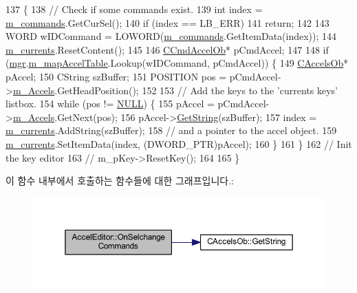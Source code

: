 \begin{DoxyCode}
137 \{
138   \textcolor{comment}{// Check if some commands exist.}
139   \textcolor{keywordtype}{int} index = \mbox{\hyperlink{class_accel_editor_aba4ea3d3eced08de9fe39e307b5f40fc}{m\_commands}}.GetCurSel();
140   \textcolor{keywordflow}{if} (index == LB\_ERR)
141     \textcolor{keywordflow}{return};
142 
143   WORD wIDCommand = LOWORD(\mbox{\hyperlink{class_accel_editor_aba4ea3d3eced08de9fe39e307b5f40fc}{m\_commands}}.GetItemData(index));
144   \mbox{\hyperlink{class_accel_editor_a31909da8a929ef7b5e22ffbf64f1c68c}{m\_currents}}.ResetContent();
145 
146   \mbox{\hyperlink{class_c_cmd_accel_ob}{CCmdAccelOb}}* pCmdAccel;
147   
148   \textcolor{keywordflow}{if} (\mbox{\hyperlink{class_accel_editor_acb731e2193cb5022a95e83122651f96d}{mgr}}.\mbox{\hyperlink{class_c_accelerator_manager_a16b8d3e9328bc0eeeb048630deff2768}{m\_mapAccelTable}}.Lookup(wIDCommand, pCmdAccel)) \{
149     \mbox{\hyperlink{class_c_accels_ob}{CAccelsOb}}* pAccel;
150     CString szBuffer;
151     POSITION pos = pCmdAccel->\mbox{\hyperlink{class_c_cmd_accel_ob_a85772f1ea9204af42b8a39a0135dc0f8}{m\_Accels}}.GetHeadPosition();
152 
153     \textcolor{comment}{// Add the keys to the 'currents keys' listbox.}
154     \textcolor{keywordflow}{while} (pos != \mbox{\hyperlink{getopt1_8c_a070d2ce7b6bb7e5c05602aa8c308d0c4}{NULL}}) \{
155       pAccel = pCmdAccel->\mbox{\hyperlink{class_c_cmd_accel_ob_a85772f1ea9204af42b8a39a0135dc0f8}{m\_Accels}}.GetNext(pos);
156       pAccel->\mbox{\hyperlink{class_c_accels_ob_afaf7510fa1e0707863f6bd469f190de6}{GetString}}(szBuffer);
157       index = \mbox{\hyperlink{class_accel_editor_a31909da8a929ef7b5e22ffbf64f1c68c}{m\_currents}}.AddString(szBuffer);
158       \textcolor{comment}{// and a pointer to the accel object.}
159       \mbox{\hyperlink{class_accel_editor_a31909da8a929ef7b5e22ffbf64f1c68c}{m\_currents}}.SetItemData(index, (DWORD\_PTR)pAccel);
160     \}
161   \}
162   \textcolor{comment}{// Init the key editor}
163   \textcolor{comment}{//  m\_pKey->ResetKey();}
164 
165 \}
\end{DoxyCode}
이 함수 내부에서 호출하는 함수들에 대한 그래프입니다.\+:
\nopagebreak
\begin{figure}[H]
\begin{center}
\leavevmode
\includegraphics[width=350pt]{class_accel_editor_a16cb5c73f55199115c5a4f35268ff3fa_cgraph}
\end{center}
\end{figure}
